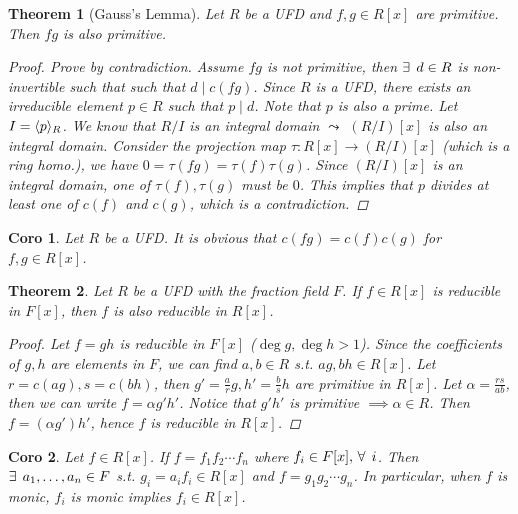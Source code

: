 \documentclass[a4paper]{article}
\let\existstemp\exists
\let\foralltemp\forall
\renewcommand*{\exists}{\existstemp\mkern4mu}
\renewcommand*{\forall}{\foralltemp\mkern4mu}
\DeclarePairedDelimiter{\gen}{\langle}{\rangle} %
\newcommand*\quot[2]{{#1}/{#2}}
\theoremstyle{mystyle}
\newtheorem{theorem}{Theorem}
\newtheorem{coro}{Coro}
\begin{document}
\begin{theorem}[Gauss's Lemma]
  Let $R$ be a UFD and $f, g \in R[x]$ are primitive. Then $fg$
  is also primitive.
  \begin{proof}
    Prove by contradiction. Assume $fg$ is not primitive, then
    $\exists d \in R$ is non-invertible such that such that $d \mid c(fg)$.
    Since $R$ is a UFD, there exists an irreducible element $p \in R$
    such that $p \mid d$. Note that $p$ is also a prime. Let $I = \gen{p}_R$.
    We know that $\quot{R}{I}$ is an integral domain $\leadsto$
    $(\quot{R}{I})[x]$ is also an integral domain.
    Consider the projection map $\tau: R[x] \to (\quot{R}{I})[x]$ (which is
    a ring homo.), we have $0 = \tau(fg) = \tau(f)\tau(g)$. Since
    $(\quot{R}{I})[x]$ is an integral domain, one of $\tau(f), \tau(g)$ must
    be $0$. This implies that $p$ divides at least one of $c(f)$ and $c(g)$,
    which is a contradiction.
  \end{proof}
\end{theorem}

\begin{coro}
  Let $R$ be a UFD. It is obvious that $c(fg) = c(f)c(g)$ for $f, g \in R[x]$.
\end{coro}

\begin{theorem}
  Let $R$ be a UFD with the fraction field $F$. If $f \in R[x]$
  is reducible in $F[x]$, then $f$ is also reducible in $R[x]$.

  \begin{proof}
    Let $f = gh$ is reducible in $F[x]$ ($\deg g, \deg h > 1$).
    Since the coefficients of $g, h$ are elements in $F$, we can find
    $a, b \in R$ s.t. $ag, bh \in R[x]$. Let $r = c(ag), s = c(bh)$, then
    $g' = \frac{a}{r}g, h' = \frac{b}{s}h$ are primitive in $R[x]$.
    Let $\alpha = \frac{rs}{ab}$, then we can write $f = \alpha g' h'$.
    Notice that $g'h'$ is primitive $\implies \alpha \in R$.
    Then $f = (\alpha g')  h'$, hence $f$ is reducible in $R[x]$.
  \end{proof}
\end{theorem}

\begin{coro}
  Let $f \in R[x]$. If $f = f_1 f_2 \dotsm f_n$ where $f_i \in F[x],\, \forall i$.
  Then $\exists a_1, \dots, a_n \in F$ s.t. $g_i = a_if_i \in R[x]$ and
  $f = g_1 g_2 \dotsm g_n$.
  In particular, when $f$ is monic, $f_i$ is monic implies $f_i \in R[x]$.
\end{coro}
\end{document}
